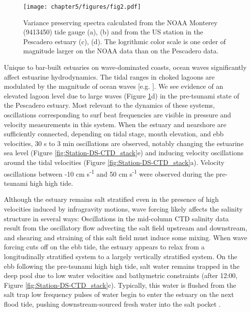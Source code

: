

\begin{figure}
\textsf{\texttt{[image: chapter5/figures/fig2.pdf]}}

\protect\caption{Variance preserving spectra calculated from the NOAA Monterey (9413450)
tide gauge (a), (b) and from the US station in the Pescadero estuary
(c), (d).  The logrithmic color scale is one order of magnitude larger
on the NOAA data than on the Pescadero data.\label{fig:Pescadero-stacked-variance_presreving_spectra}}
\end{figure}

Unique to bar-built estuaries on wave-dominated coasts, ocean waves
significantly affect estuarine hydrodynamics. The tidal ranges in
choked lagoons are modulated by the magnitude of ocean waves {[}e.g.
\citealp{malhada_ea_wavesetup}{]}. We see evidence of an elevated
lagoon level due to large waves (Figure \ref{fig:Pescadero-stacked-variance_presreving_spectra}d)
in the pre-tsunami state of the Pescadero estuary. Most relevant to
the dynamics of these systems, oscillations corresponding to surf
beat frequencies are visible in pressure and velocity measurements
in this system. When the estuary and nearshore are sufficiently connected,
depending on tidal stage, mouth elevation, and ebb velocities, 30
s to 3 min oscillations are observed, notably changing the estuarine
sea level (Figure \ref{fig:Station-DS-CTD_stack}e) and inducing velocity
oscillations around the tidal velocities (Figure \ref{fig:Station-DS-CTD_stack}a).
Velocity oscillations between -10 cm s\textsuperscript{-1} and 50
cm s\textsuperscript{-1} were observed during the pre-tsunami high
high tide. 

Although the estuary remains salt stratified even in the presence
of high velocities induced by infragravity motions, wave forcing likely
affects the salinity structure in several ways: Oscillations in the
mid-column CTD salinity data result from the oscillatory flow advecting
the salt field upstream and downstream, and shearing and straining
of this salt field must induce some mixing. When wave forcing cuts
off on the ebb tide, the estuary appears to relax from a longitudinally
stratified system to a largely vertically stratified system. On the
ebb following the pre-tsunami high high tide, salt water remains trapped
in the deep pool due to low water velocities and bathymetric constraints
(after 12:00, Figure \ref{fig:Station-DS-CTD_stack}c). Typically,
this water is flushed from the salt trap low frequency pulses of water
begin to enter the estuary on the next flood tide, pushing downstream-sourced
fresh water into the salt pocket \citep{williams_stacey_inprep}. 


